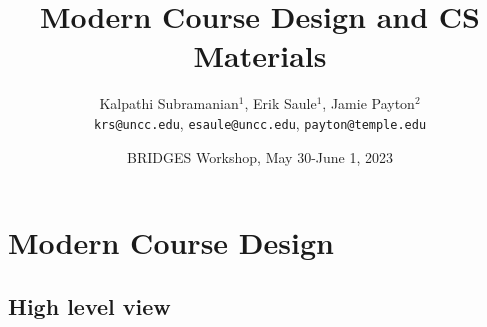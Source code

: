 \documentclass[aspectratio=169]{beamer}
\title{Modern Course Design and CS Materials}
\subtitle{}
\author{Kalpathi Subramanian$^1$, Erik Saule$^1$, Jamie Payton$^2$\\\texttt{krs@uncc.edu}, \texttt{esaule@uncc.edu}, \texttt{payton@temple.edu} }
\institute{$^1$The University of North Carolina at Charlotte\\$^2$Temple University}
\date{BRIDGES Workshop, May 30-June 1, 2023}
\begin{document}
\begin{frame}
\titlepage
\end{frame}




\section{Modern Course Design}

\subsection{High level view}
\end{document}
